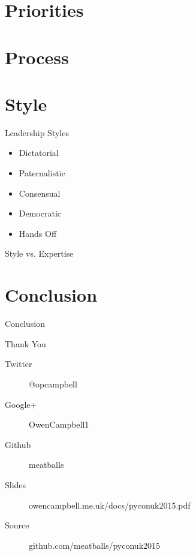 \documentclass[14pt]{beamer}
\begin{document}
  \section{Priorities}
    \blankscreen

    \begin{frame}{}
      
    \end{frame}

  \section{Process}
    \blankscreen

  \section{Style}

    \begin{frame}{Leadership Styles}
      \begin{itemize}
        \item Dictatorial
        \item Paternalistic
        \item Consensual
        \item Democratic
        \item Hands Off
      \end{itemize}
    \end{frame}

    \begin{frame}{Style vs. Expertise}
      
    \end{frame}

  \section{Conclusion}

    \begin{frame}{Conclusion}
    \end{frame}

    \begin{frame}{Thank You}
      \begin{description}
        \item [Twitter] @opcampbell
        \item [Google+] OwenCampbell1
        \item [Github] meatballs
      \end{description}
      \vfill
      \begin{description}
        \item [Slides] {\small owencampbell.me.uk/docs/pyconuk2015.pdf}
        \item [Source] {\small github.com/meatballs/pyconuk2015}
      \end{description}
    \end{frame}
\end{document}
